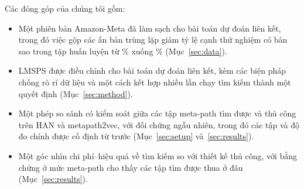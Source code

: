 Các đóng góp của chúng tôi gồm:
\begin{itemize}
  \item Một phiên bản Amazon-Meta đã làm sạch cho bài toán dự đoán liên kết, trong đó việc gộp các
        ấn bản trùng lặp giảm tỷ lệ cạnh thử nghiệm có bản sao trong tập huấn luyện từ
        \% xuống \% (Mục~\ref{sec:data}).
  \item LMSPS được điều chỉnh cho bài toán dự đoán liên kết, kèm các biện pháp chống rò rỉ dữ liệu
        và một cách kết hợp nhiều lần chạy tìm kiếm thành một quyết định
        (Mục~\ref{sec:method}).
  \item Một phép so sánh có kiểm soát giữa các tập meta-path tìm được và thủ công trên HAN và
        metapath2vec, với đối chứng ngẫu nhiên, trong đó các tập và độ đo chính được cố định từ
        trước (Mục~\ref{sec:setup} và~\ref{sec:results}).
  \item Một góc nhìn chi phí--hiệu quả về tìm kiếm so với thiết kế thủ công, với bằng chứng ở mức
        meta-path cho thấy các tập tìm được thua ở đâu (Mục~\ref{sec:results}).
\end{itemize}
